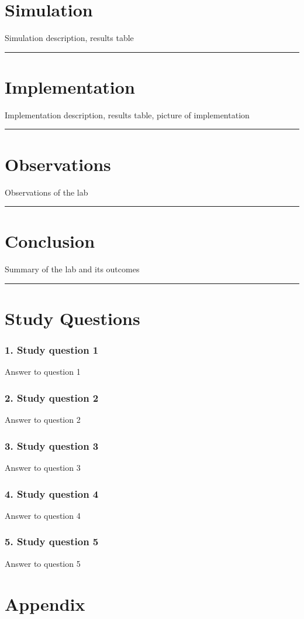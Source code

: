 \documentclass{article}
\begin{document}
\section*{\textcolor{mycolor}{Simulation}}
Simulation description, results table
\vspace{5mm}
\hrule

\section*{\textcolor{mycolor}{Implementation}}
Implementation description, results table, picture of implementation
\vspace{5mm}
\hrule

\section*{\textcolor{mycolor}{Observations}}
Observations of the lab
\vspace{5mm}
\hrule

\section*{\textcolor{mycolor}{Conclusion}}
Summary of the lab and its outcomes
\vspace{5mm}
\hrule

\section*{\textcolor{mycolor}{Study Questions}}
\subsubsection*{\textcolor{mycolor}{1. Study question 1}}
Answer to question 1
\subsubsection*{\textcolor{mycolor}{2. Study question 2}}
Answer to question 2
\subsubsection*{\textcolor{mycolor}{3. Study question 3}}
Answer to question 3
\subsubsection*{\textcolor{mycolor}{4. Study question 4}}
Answer to question 4
\subsubsection*{\textcolor{mycolor}{5. Study question 5}}
Answer to question 5
\section*{\textcolor{mycolor}{Appendix}}
\end{document}
